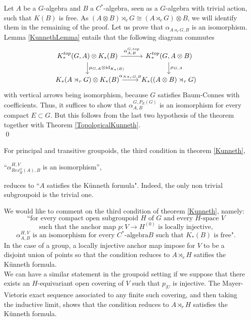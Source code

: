 \begin{dem} %

Let $A$ be a $G$-algebra and $B$ a $C^*$-algebra, seen as a $G$-algebra with trivial action, such that $K(B)$ is free. As $(A\otimes B)\rtimes_r G \cong (A\rtimes_r G)\otimes B$, we will identify them in the remaining of the proof. Let us prove that $\alpha_{A\rtimes_r G,B}$ is an isomorphism.\\

Lemma \ref{KunnethLemma} entails that the following diagram commutes
\[\begin{tikzcd}
K_*^{top}(G,A)\otimes K_*(B) \arrow{r}{\alpha^{G,top}_{A,B}}\arrow{d}{\mu_{G,A}\otimes \text{id}_{K_*(B)}} & 
K_*^{top}(G,A\otimes B) \arrow{d}{\mu_{G,A}} \\
K_*(A\rtimes_r G)\otimes K_*(B) \arrow{r}{\alpha_{A\rtimes_r G,B}} & 
K_*((A\otimes B)\rtimes_r G)
\end{tikzcd}\]
with vertical arrows being isomorphism, because $G$ satisfies Baum-Connes with coefficients. Thus, it suffices to show that $\alpha^{G,P_E(G)}_{A,B}$ is an isomorphism for every compact $E\subset G$. But this follows from the last two hypothesis of the theorem together with Theorem \ref{TopologicalKunneth}.\\ 
\qed
\end{dem}

\begin{rk}
For principal and transitive groupoids, the third condition in theorem \ref{Kunneth},
\begin{center} 
``$\alpha_{Res_H^G(A),B}^{H,V}$ is an isomorphism'',
\end{center}
reduces to ``$A$ satisfies the Künneth formula". Indeed, the only non trivial subgroupoid is the trivial one.
\end{rk}

\begin{rk}
We would like to comment on the third condition of theorem \ref{Kunneth}, namely:
\[\text{``for every compact open subgroupoid }H \text{ of } G \text{ and every }H \text{-space }V \]
\[\text{ such that the anchor map }p : V \rightarrow H^{(0)}\text{ is locally injective, }\]
\[\alpha_{A,B}^{H,V}\text{ is an isomorphism for every } C^*\text{-algebra} B \text{ such that $K_*(B)$ is free".}\]
In the case of a group, a locally injective anchor map impose for $V$ to be a disjoint union of points so that the condition reduces to $A\rtimes_r H$ satifies the Künneth formula. \\

We can have a similar statement in the groupoid setting if we suppose that there exists an $H$-equivariant open covering of $V$ such that $p_{|U}$ is injective. The Mayer-Vietoris exact sequence associated to any finite such covering, and then taking the inductive limit, shows that the condition reduces to $A\rtimes_r H$ satisfies the Künneth formula.  
\end{rk}

